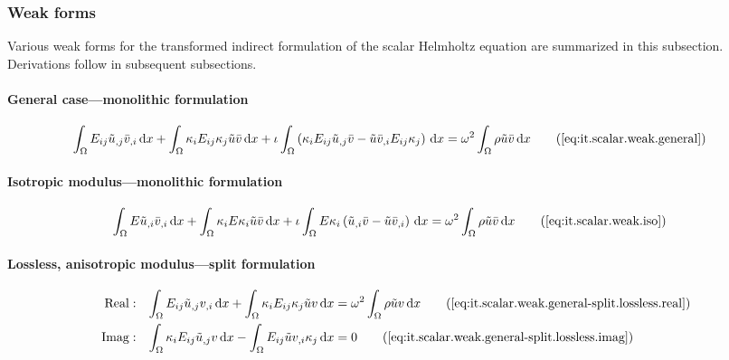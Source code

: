 \subsubsection{Weak forms} \label{it.scalar.weak}

Various weak forms for the transformed indirect formulation of the scalar Helmholtz equation are summarized in this subsection. Derivations follow in subsequent subsections.

\paragraph{General case---monolithic formulation}
%
\begin{align*}
    \int_{\Omega} {
        E_{ij} \kernel{u}_{,j} \bar{v}_{,i} \dx
    } + \int_{\Omega} {
        \wavenum_{i} E_{ij} \wavenum_{j} \kernel{u} \bar{v} \dx
    } + \imag \int_{\Omega} {
        \left(
        \wavenum_{i} E_{ij} \kernel{u}_{,j} \bar{v}
        - \kernel{u} \bar{v}_{,i} E_{ij} \wavenum_{j}
        \right) \dx
    } &=
    \omega^2 \int_{\Omega} { \rho \kernel{u} \bar{v} \dx }
    \tag{\ref{eq:it.scalar.weak.general}}
\end{align*}


\paragraph{Isotropic modulus---monolithic formulation}
%
\begin{align}
    \int_{\Omega} {
        E \kernel{u}_{,i} \bar{v}_{,i} \dx
    } + \int_{\Omega} {
        \wavenum_{i} E \wavenum_{i} \kernel{u} \bar{v} \dx
    } + \imag \int_{\Omega} {
        E \wavenum_{i} \left(
        \kernel{u}_{,i} \bar{v} - \kernel{u} \bar{v}_{,i}
        \right) \dx
    } &=
    \omega^2 \int_{\Omega} { \rho \kernel{u} \bar{v} \dx }
    \tag{\ref{eq:it.scalar.weak.iso}}
\end{align}


\paragraph{Lossless, anisotropic modulus---split formulation}
%
\begin{align}
    \mathrm{Real:}& & \int_{\Omega} {
        E_{ij} \kernel{u}_{,j} v_{,i} \dx
    } + \int_{\Omega} {
        \wavenum_{i} E_{ij} \wavenum_{j} \kernel{u} v \dx
    } &= \omega^2 \int_{\Omega} {
        \rho \kernel{u} v \dx
    } \tag{\ref{eq:it.scalar.weak.general-split.lossless.real}} \\
    \mathrm{Imag:}& & \int_{\Omega} {
        \wavenum_{i} E_{ij} \kernel{u}_{,j} v \dx
    } - \int_{\Omega} {
        E_{ij} \kernel{u} v_{,i} \wavenum_{j} \dx
    } &= 0 \tag{\ref{eq:it.scalar.weak.general-split.lossless.imag}}
\end{align}


